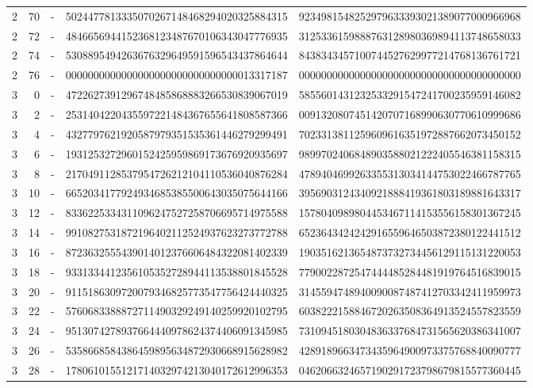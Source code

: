 \begin{longtable}{rrrll}
2 & 70 & - & 5024477813335070267148468294020325884315 & 9234981548252979633393021389077000966968 \\
2 & 72 & - & 4846656944152368123487670106343047776935 & 3125336159888763128980369894113748658033 \\
2 & 74 & - & 5308895494263676329649591596543437864644 & 8438343457100744527629977214768136761721 \\
2 & 76 & - & 0000000000000000000000000000000013317187 & 0000000000000000000000000000000000000000 \\
3 & 0 & - & 4722627391296748485868883266530839067019 & 5855601431232533291547241700235959146082 \\
3 & 2 & - & 2531404220435597221484367655641808587366 & 0091320807451420707168990630770610999686 \\
3 & 4 & - & 4327797621920587979351535361446279299491 & 7023313811259609616351972887662073450152 \\
3 & 6 & - & 1931253272960152425959869173676920935697 & 9899702406848903588021222405546381158315 \\
3 & 8 & - & 2170491128537954726212104110536040876284 & 4789404699263355313034144753022466787765 \\
3 & 10 & - & 6652034177924934685385500643035075644166 & 3956903124340921888419361803189881643317 \\
3 & 12 & - & 8336225334311096247527258706695714975588 & 1578040989804453467114153556158301367245 \\
3 & 14 & - & 9910827531872196402112524937623273772788 & 6523643424242916559646503872380122441512 \\
3 & 16 & - & 8723632555439014012376606484322081402339 & 1903516213654873732734456129115131220053 \\
3 & 18 & - & 9331334412356105352728944113538801845528 & 7790022872547444485284481919764516839015 \\
3 & 20 & - & 9115186309720079346825773547756424440325 & 3145594748940090087487412703342411959973 \\
3 & 22 & - & 5760683388872711490329249140259920102795 & 6038222158846720263508364913524557823559 \\
3 & 24 & - & 9513074278937664440978624374406091345985 & 7310945180304836337684731565620386341007 \\
3 & 26 & - & 5358668584386459895634872930668915628982 & 4289189663473435964900973375768840090777 \\
3 & 28 & - & 1780610155121714032974213040172612996353 & 0462066324657190291723798679815577360445 \\

\end{longtable}
